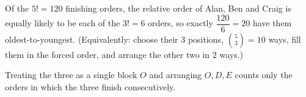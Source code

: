 Of the $5!=120$ finishing orders, the relative order of Alan, Ben and Craig is equally likely to be each of the $3!=6$ orders, so exactly $\dfrac{120}{6}=\boxed{20}$ have them oldest-to-youngest. (Equivalently: choose their $3$ positions, $\binom53=10$ ways, fill them in the forced order, and arrange the other two in $2$ ways.)

Treating the three as a single block $O$ and arranging $O,D,E$ counts only the orders in which the three finish consecutively.
